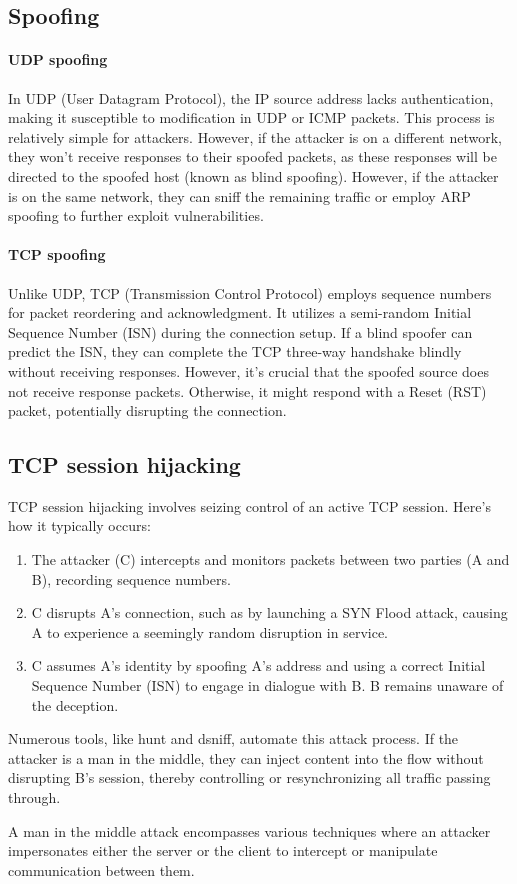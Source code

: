 \subsection{Spoofing}

\paragraph*{UDP spoofing}
In UDP (User Datagram Protocol), the IP source address lacks authentication, making it susceptible to modification in UDP or ICMP packets.
This process is relatively simple for attackers. 
However, if the attacker is on a different network, they won't receive responses to their spoofed packets, as these responses will be directed to the spoofed host (known as blind spoofing).
However, if the attacker is on the same network, they can sniff the remaining traffic or employ ARP spoofing to further exploit vulnerabilities.
\paragraph*{TCP spoofing}
Unlike UDP, TCP (Transmission Control Protocol) employs sequence numbers for packet reordering and acknowledgment. 
It utilizes a semi-random Initial Sequence Number (ISN) during the connection setup.
If a blind spoofer can predict the ISN, they can complete the TCP three-way handshake blindly without receiving responses. 
However, it's crucial that the spoofed source does not receive response packets. 
Otherwise, it might respond with a Reset (RST) packet, potentially disrupting the connection.

\subsection{TCP session hijacking}
TCP session hijacking involves seizing control of an active TCP session. 
Here's how it typically occurs:
\begin{enumerate}
    \item The attacker (C) intercepts and monitors packets between two parties (A and B), recording sequence numbers.
    \item C disrupts A's connection, such as by launching a SYN Flood attack, causing A to experience a seemingly random disruption in service.
    \item C assumes A's identity by spoofing A's address and using a correct Initial Sequence Number (ISN) to engage in dialogue with B. B remains unaware of the deception.
\end{enumerate}
Numerous tools, like hunt and dsniff, automate this attack process.
If the attacker is a man in the middle, they can inject content into the flow without disrupting B's session, thereby controlling or resynchronizing all traffic passing through.
\begin{definition}
    A man in the middle attack encompasses various techniques where an attacker impersonates either the server or the client to intercept or manipulate communication between them.
\end{definition}

